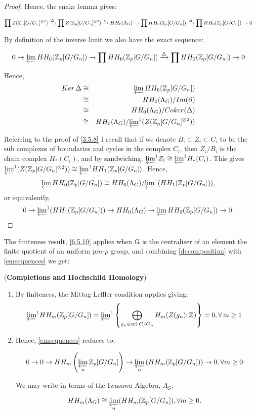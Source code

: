 \begin{proof}
Hence, the snake lemma gives:

$$\prod Z(\mathbb Z_p [G/G_n]^{\otimes 2} ) \xrightarrow{\Delta} \prod Z(\mathbb Z_p [G/G_n]^{\otimes 2} ) \xrightarrow {\partial} HH_0 (\Lambda_G) \rightarrow \prod HH_0 (\mathbb Z_p [G/G_n] ) \xrightarrow{\Delta} \prod HH_0 (\mathbb Z_p [G/G_n] ) \rightarrow 0$$

By definition of the inverse limit we also have the exact sequence:

$$0\rightarrow \varprojlim HH_0 (\mathbb Z_p[G/G_n]) \rightarrow \prod HH_0 (\mathbb Z_p [G/G_n] ) \xrightarrow{\Delta} \prod HH_0 (\mathbb Z_p [G/G_n] ) \rightarrow 0$$

Hence,
\begin{eqnarray}
Ker\, \Delta 	&\cong& \varprojlim HH_0 (\mathbb Z_p[G/G_n]) \\
			&\cong& HH_0(\Lambda_G) / Im(\partial) \\
			&\cong& HH_0(\Lambda_G) / Coker ( \Delta) \\
			&\cong& HH_0(\Lambda_G) / {\varprojlim}^1 (Z(\mathbb Z_p[G/G_n]^{\otimes 2}))
\end{eqnarray}

Referring to the proof of \ref{3.5.8} I recall that if we denote $B_i \subset Z_i \subset C_i$ to be the sub complexes of boundaries and cycles in the complex $C_i$, then $Z_i/B_i$ is the chain complex $H_*(C_i)$, and by sandwiching, ${\varprojlim}^1 Z_i \cong {\varprojlim}^1 H_*(C_i)$. This gives  ${\varprojlim}^1 (Z(\mathbb Z_p[G/G_n]^{\otimes 2})) \cong {\varprojlim}^1 HH_1(\mathbb Z_p[G/G_n])$. Hence, 
$$\varprojlim HH_0 (\mathbb Z_p[G/G_n]) \cong HH_0(\Lambda_G) / {\varprojlim}^1 (HH_1(\mathbb Z_p[G/G_n])),$$
or equivalently,
$$0\rightarrow  {\varprojlim}^1 (HH_1(\mathbb Z_p[G/G_n])) \rightarrow HH_0(\Lambda_G) \rightarrow \varprojlim HH_0 (\mathbb Z_p[G/G_n])\rightarrow 0.$$


\end{proof}


The finiteness result, \ref{6.5.10} applies when G is the centraliser of an element the finite quotient of an uniform pro-$p$ group, and combining \ref{decomposition} with \ref{emsequences} we get:

\begin{corollary}(\textbf{Completions and Hochschild Homology}\label{finitehh})
\begin{enumerate}
\item By finiteness, the Mittag-Leffler condition applies giving:
$${\varprojlim}^1 HH_m (\mathbb Z_p [G/G_n]) = {\varprojlim}^1 \left \{ \bigoplus _{g_n \in \text{ccl } G/G_n } H_m (Z(g_n); \mathbb Z) \right \} = 0, \forall\, m\geq 1$$

\item Hence, \ref{emsequences} reduces to:

$$ 0 \rightarrow 0 \rightarrow HH_m \left ( \varprojlim_n \mathbb Z_p [G/G_n] \right )  \rightarrow  \varprojlim_n \left ( HH_m ( \mathbb Z_p [G/G_n])\right ) \rightarrow 0, \forall m\geq 0$$

We may write in terms of the Iwasawa Algebra, $\Lambda_G$:

$$HH_m (\Lambda_G) \cong  \varprojlim_n (HH_m ( \mathbb Z_p [G/G_n]), \forall m\geq 0.$$
 
\end{enumerate}
\end{corollary}

